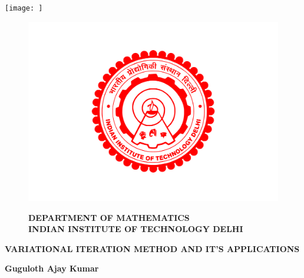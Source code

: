 \documentclass[12pt, a4paper]{report}
\begin{document}
\begin{titlepage}
    \begin{center}
        \vspace*{4cm}
        
        \texttt{[image: ]}
         \begin{figure}
            \centering
            \includegraphics[width=0.5\linewidth]{IIT-Delhi-Indian-Institute-of-Technology-Delhi.png}
            \begin{center}
                \textbf{DEPARTMENT OF MATHEMATICS}\\
                \textbf{INDIAN INSTITUTE OF TECHNOLOGY DELHI}
            \end{center}
            
        \end{figure}
        
        
        \textbf{\Large VARIATIONAL ITERATION METHOD AND IT'S APPLICATIONS}
        
        \vspace{5.0cm}
        
        \textbf {\Large Guguloth Ajay Kumar}
        
        

        
        
        
    \end{center}
\end{titlepage}
    
\end{document}
